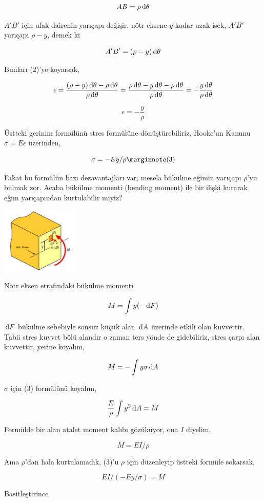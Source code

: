 \documentclass[12pt,fleqn]{article}\usepackage{../../common}
\begin{document}
$$
AB = \rho \,\mathrm{d} \theta
$$

$A'B'$ için ufak dairenin yarıçapı değişir, nötr eksene $y$ kadar uzak isek,
$A'B'$ yarıçapı $\rho - y$, demek ki 

$$
A'B' = (\rho - y) \,\mathrm{d} \theta
$$

Bunları (2)'ye koyarsak,

$$
\epsilon = \frac{(\rho - y) \,\mathrm{d} \theta - \rho \,\mathrm{d} \theta}{\rho \,\mathrm{d}\theta} =
\frac{\rho \,\mathrm{d}\theta - y \,\mathrm{d}\theta - \rho \,\mathrm{d}\theta}{\rho \,\mathrm{d}\theta} =
- \frac{y \,\mathrm{d}\theta}{\rho \,\mathrm{d}\theta}
$$

$$
\epsilon = - \frac{y}{\rho}
$$

Üstteki gerinim formülünü stres formülüne dönüştürebiliriz, Hooke'un Kanunu
$\sigma = E \epsilon$ üzerinden,

$$
\sigma = -E y / \rho
\mlabel{3}
$$

Fakat bu formülün bazı dezavantajları var, mesela bükülme eğimin yarıçapı
$\rho$'yu bulmak zor. Acaba bükülme momenti (bending moment) ile bir ilişki
kurarak eğim yarıçapından kurtulabilir miyiz?

\includegraphics[width=10em]{phy_020_strs_00_05.jpg}

Nötr eksen etrafındaki bükülme momenti

$$
M = \int y (-\,\mathrm{d} F)
$$


$\,\mathrm{d} F$ bükülme sebebiyle sonsuz küçük alan $\,\mathrm{d} A$ üzerinde etkili olan
kuvvettir. Tabii stres kuvvet bölü alandır o zaman ters yönde de gidebiliriz,
stres çarpı alan kuvvettir, yerine koyalım,

$$
M = -\int y \sigma \,\mathrm{d} A
$$

$\sigma$ için (3) formülünü koyalım,

$$
\frac{E}{\rho} \int y^2 \,\mathrm{d} A = M
$$

Formülde bir alan atalet moment kalıbı gözüküyor, ona $I$ diyelim,

$$
M = E I / \rho
$$

Ama $\rho$'dan hala kurtulamadık, (3)'u $\rho$ için düzenleyip üstteki formüle
sokarsak,

$$
EI / (-Ey / \sigma )  = M
$$

Basitleştirince
\end{document}
